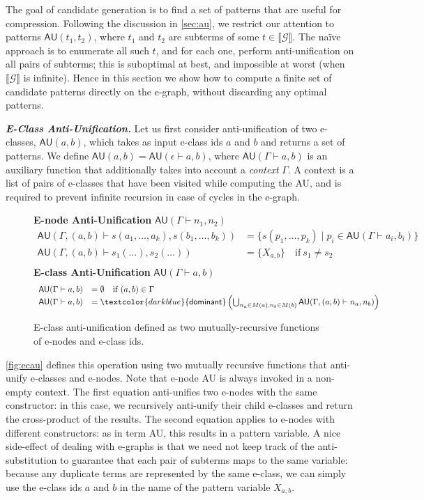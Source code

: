 \documentclass[acmsmall,screen,nonacm,review=false,timestamp=false]{acmart}
\newcommand{\emphbf}[1]{\emph{\textbf{#1}\xspace}}
\newcommand{\mypara}[1]{\smallskip\noindent\emphbf{#1.}\xspace}
\newcommand{\gau}{\mathsf{AU}}
\newcommand{\denot}[1]{\llbracket #1 \rrbracket}
\newcommand{\dominant}{\mathsf{dominant}}
\newcommand{\ecau}[3]{\gau(#1 \vdash #2,#3)}
\newcommand{\emptyseq}{\epsilon}
\begin{document}
The goal of candidate generation is to find a set of patterns
that are useful for compression.
Following the discussion in \autoref{sec:au},
we restrict our attention to patterns $\gau(t_1, t_2)$,
where $t_1$ and $t_2$ are subterms of some $t \in \denot{\mathcal{G}}$.
The na\"ive approach is to enumerate all such $t$,
and for each one, perform anti-unification on all pairs of subterms;
this is suboptimal at best,
and impossible at worst (when $\denot{\mathcal{G}}$ is infinite).
Hence in this section we show how to compute a finite set of candidate patterns 
directly on the e-graph,
without discarding any optimal patterns.

\mypara{E-Class Anti-Unification}
Let us first consider anti-unification of two e-classes, $\gau(a,b)$,
which takes as input e-class ids $a$ and $b$
and returns a set of patterns.
We define $\gau(a,b) = \ecau{\emptyseq}{a}{b}$,
where $\ecau{\Gamma}{a}{b}$ is an auxiliary function
that additionally takes into account a \emph{context} $\Gamma$.
A context is a list of pairs of e-classes that have been visited while computing the AU,
and is required to prevent infinite recursion in case of cycles in the e-graph.


\begin{figure}
  \textbf{E-node Anti-Unification} $\ecau{\Gamma}{n_1}{n_2}$
  $$
  \begin{array}{rl}
    \ecau{\Gamma, (a,b)}{s(a_1,\ldots,a_k)}{s(b_1,\ldots,b_k)} &= \{s(p_1,\ldots,p_k) \mid p_i \in \ecau{\Gamma}{a_i}{b_i}\}\\
    \ecau{\Gamma, (a,b)}{s_1(\ldots)}{s_2(\ldots)} &= \{X_{a,b}\} \quad\text{if}\ s_1 \neq s_2\\
    \end{array}
  $$
  \textbf{E-class Anti-Unification} $\ecau{\Gamma}{a}{b}$
  $$
  \begin{array}{rl}
    \ecau{\Gamma}{a}{b} &= \emptyset \quad\text{if}\ (a,b) \in \Gamma\\
\ecau{\Gamma}{a}{b} &= \textcolor{darkblue}{\dominant} \left(
       \bigcup_{n_a \in M(a), n_b \in M(b)} \ecau{\Gamma, (a, b)}{n_a}{n_b} 
    \right)
  \end{array}
  $$
\caption{E-class anti-unification defined as two mutually-recursive functions of e-nodes and e-class ids.}\label{fig:ecau}
\end{figure}

\autoref{fig:ecau} defines this operation using two mutually recursive functions
that anti-unify e-classes and e-nodes.
Note that e-node AU is always invoked in a non-empty context.
The first equation anti-unifies two e-nodes with the same constructor:
in this case, we recursively anti-unify their child e-classes
and return the cross-product of the results.
The second equation applies to e-nodes with different constructors:
as in term AU, this results in a pattern variable.
A nice side-effect of dealing with e-graphs
is that we need not keep track of the anti-substitution
to guarantee that each pair of subterms maps to the same variable:
because any duplicate terms are represented by the same e-class,
we can simply use the e-class ids $a$ and $b$ in the name of the pattern variable $X_{a,b}$.
\end{document}
